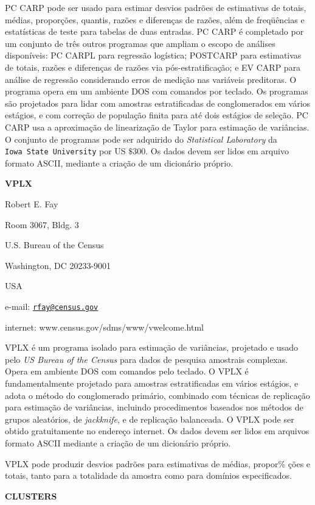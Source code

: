 \documentclass[]{book}
\numberwithin{example}{chapter}
\numberwithin{remark}{chapter}
\numberwithin{definition}{chapter}
\begin{document}
PC CARP pode ser usado para estimar desvios padrões de estimativas de
totais, médias, proporções, quantis, razões e diferenças de razões, além
de freqüências e estatísticas de teste para tabelas de duas entradas. PC
CARP é completado por um conjunto de três outros programas que ampliam o
escopo de análises disponíveis: PC CARPL para regressão logística;
POSTCARP para estimativas de totais, razões e diferenças de razões via
pós-estratificação; e EV CARP para análise de regressão considerando
erros de medição nas variáveis preditoras. O programa opera em um
ambiente DOS com comandos por teclado. Os programas são projetados para
lidar com amostras estratificadas de conglomerados em vários estágios, e
com correção de população finita para até dois estágios de seleção. PC
CARP usa a aproximação de linearização de Taylor para estimação de
variâncias. O conjunto de programas pode ser adquirido do \emph{%
Statistical Laboratory} da \texttt{Iowa\ State\ University} por US
\(\$300\). Os dados devem ser lidos em arquivo formato ASCII, mediante a
criação de um dicionário próprio.

\textbf{VPLX}

Robert E. Fay

Room 3067, Bldg. 3

U.S. Bureau of the Census

Washington, DC 20233-9001

USA

e-mail: \href{mailto:rfay@census.gov}{\nolinkurl{rfay@census.gov}}

internet: www.census.gov/sdms/www/vwelcome.html\medskip

VPLX é um programa isolado para estimação de variâncias, projetado e
usado pelo \emph{US Bureau of the Census} para dados de pesquisa
amostrais complexas. Opera em ambiente DOS com comandos pelo teclado. O
VPLX é fundamentalmente projetado para amostras estratificadas em vários
estágios, e adota o método do conglomerado primário, combinado com
técnicas de replicação para estimação de variâncias, incluindo
procedimentos baseados nos métodos de grupos aleatórios, de
\emph{jackknife}, e de replicação balanceada. O VPLX pode ser obtido
gratuitamente no endereço internet. Os dados devem ser lidos em arquivos
formato ASCII mediante a criação de um dicionário próprio.

VPLX pode produzir desvios padrões para estimativas de médias, propor\%
ções e totais, tanto para a totalidade da amostra como para domínios
especificados.

\textbf{CLUSTERS}
\end{document}
